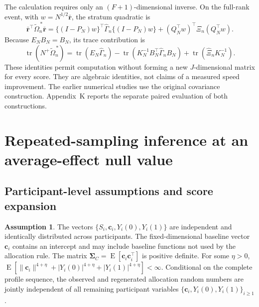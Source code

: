 \documentclass[12pt,a4paper]{article}
\theoremstyle{definition}
\newtheorem{assumption}{Assumption}
\theoremstyle{remark}\newtheorem{remark}{Remark}
\numberwithin{equation}{section}
\newcommand{\E}{\operatorname{E}}
\begin{document}
The calculation requires only an $(F+1)$-dimensional inverse. On the full-rank event, with $w=N^{1/2}\bar{\bm r}$, the stratum quadratic is
\[
 \bar{\bm r}^\top\widetilde\Omega_n^{\,*}\bar{\bm r}
 =\{(I-P_N)w\}^\top\widehat\Gamma_n\{(I-P_N)w\}
  +(Q_N^\top w)^\top\widehat\Xi_n(Q_N^\top w).
\]
Because $E_NB_N=B_N$, its trace contribution is
\[
 \operatorname{tr}(N^+\widetilde\Omega_n^{\,*})
 =\operatorname{tr}(E_N\widehat\Gamma_n)
  -\operatorname{tr}(K_N^{-1}B_N^\top\widehat\Gamma_nB_N)
  +\operatorname{tr}(\widehat\Xi_nK_N^{-1}).
\]
These identities permit computation without forming a new $J$-dimensional matrix for every score. They are algebraic identities, not claims of a measured speed improvement. The earlier numerical studies use the original covariance construction. Appendix~K reports the separate paired evaluation of both constructions.

\section{Repeated-sampling inference at an average-effect null value}\label{sec:supp-sampling}

\subsection{Participant-level assumptions and score expansion}
\begin{assumption}\label{ass:supp-participants}
The vectors $\{S_i,\bm c_i,Y_i(0),Y_i(1)\}$ are independent and identically distributed across participants. The fixed-dimensional baseline vector $\bm c_i$ contains an intercept and may include baseline functions not used by the allocation rule. The matrix $\bm\Sigma_C=\E[\bm c_i\bm c_i^\top]$ is positive definite. For some $\eta>0$, $\E[\|\bm c_i\|^{4+\eta}+|Y_i(0)|^{4+\eta}+|Y_i(1)|^{4+\eta}]<\infty$. Conditional on the complete profile sequence, the observed and regenerated allocation random numbers are jointly independent of all remaining participant variables $\{\bm c_i,Y_i(0),Y_i(1)\}_{i\ge1}$.
\end{assumption}
\end{document}
